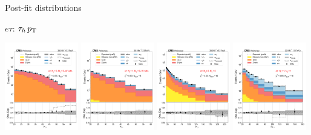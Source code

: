 \begin{frame}{Post-fit distributions}

    \begin{tcolorbox}{$e\tau$: $\tau_{h}\,p_{\mathrm{T}}$}
        \begin{center}
            \includegraphics[width=0.24\textwidth]{chapters/Analysis/sectionStatisticalAnalysis/figures/fit/etau_cat_eq0_eq0}
            \includegraphics[width=0.24\textwidth]{chapters/Analysis/sectionStatisticalAnalysis/figures/fit/etau_cat_eq1_eq0}
            \includegraphics[width=0.24\textwidth]{chapters/Analysis/sectionStatisticalAnalysis/figures/fit/etau_cat_gt2_eq0}
            \includegraphics[width=0.24\textwidth]{chapters/Analysis/sectionStatisticalAnalysis/figures/fit/etau_cat_eq1_eq1}


\end{center}
\end{tcolorbox}
\end{frame}
